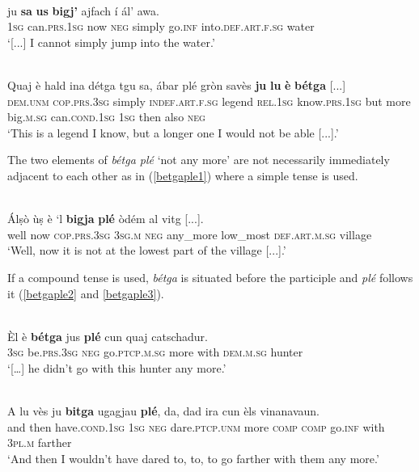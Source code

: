 \ea\label{ex:negbetg8}
\\
\gll  [...] ju \textbf{sa} \textbf{us} \textbf{bigj’} ajfach í ál’ awa.\\
{} \textsc{1sg} can.\textsc{prs.1sg} now \textsc{neg} simply go.\textsc{inf} into.\textsc{def.art.f.sg} water\\
\medskip
\glt `[...] I cannot simply jump into the water.'
\z

\ea
\label{ex:negbetg9}
\\
\gll    Quaj è hald ina détga tgu sa, ábar plé gròn savès \textbf{ju} \textbf{lu} \textbf{è} \textbf{bétga} [...]\\
\textsc{dem.unm} \textsc{cop.prs.3sg} simply \textsc{indef.art.f.sg} legend \textsc{rel.1sg} know.\textsc{prs.1sg} but more big.\textsc{m.sg} can.\textsc{cond.1sg} \textsc{1sg} then also \textsc{neg}\\
\glt `This is a legend I know, but a longer one I would not be able [...].'
\z

The two elements of \textit{bétga plé} `not any more' are not necessarily immediately adjacent to each other as in (\ref{betgaple1}) where a simple tense is used.

\ea
\label{betgaple1}
\\
\gll  Álṣò ùṣ è `l \textbf{bigja} \textbf{plé} òdém al vitg [...]. \\
well now  \textsc{cop.prs.3sg} \textsc{3sg.m} \textsc{neg} any\_more low\_most \textsc{def.art.m.sg} village\\
\glt `Well, now it is not at the lowest part of the village [...].'
\z

If a compound tense is used, \textit{bétga} is situated before the participle and \textit{plé} follows it (\ref{betgaple2} and \ref{betgaple3}).

\ea
\label{betgaple2}
 {\citealt[12]{Büchli1966}}\\
\gll   Èl è \textbf{bétga} jus \textbf{plé} cun quaj catschadur. \\
\textsc{3sg} be.\textsc{prs.3sg} \textsc{neg} go.\textsc{ptcp.m.sg} more with \textsc{dem.m.sg} hunter\\
\glt `[…] he didn’t go with this hunter any more.'
\z

\ea\label{betgaple3}
\\
\gll  A lu vès ju \textbf{bitga} ugagjau \textbf{plé}, da, dad ira cun èls vinanavaun.\\
and then have.\textsc{cond.1sg} \textsc{1sg} \textsc{neg} dare.\textsc{ptcp.unm} more \textsc{comp} \textsc{comp} go.\textsc{inf} with \textsc{3pl.m} farther\\
\glt `And then I wouldn’t have dared to, to, to go farther with them any more.'
\z


